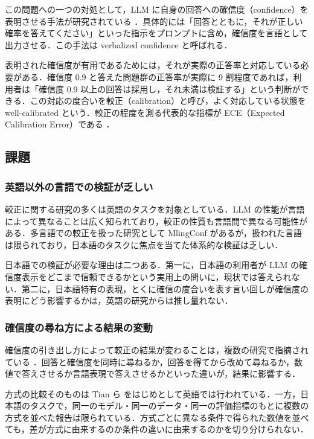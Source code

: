 この問題への一つの対処として，LLM に自身の回答への確信度（confidence）を表明させる手法が研究されている \cite{kadavath2022know,lin2022teaching,tian2023justask}．具体的には「回答とともに，それが正しい確率を答えてください」といった指示をプロンプトに含め，確信度を言語として出力させる．この手法は verbalized confidence と呼ばれる．

表明された確信度が有用であるためには，それが実際の正答率と対応している必要がある．確信度 0.9 と答えた問題群の正答率が実際に 9 割程度であれば，利用者は「確信度 0.9 以上の回答は採用し，それ未満は検証する」という判断ができる．この対応の度合いを較正（calibration）と呼び，よく対応している状態をwell-calibrated という．較正の程度を測る代表的な指標が ECE（Expected Calibration Error）である \cite{guo2017calibration}．

\subsection{課題}

\subsubsection{英語以外の言語での検証が乏しい}

較正に関する研究の多くは英語のタスクを対象としている．LLM の性能が言語によって異なることは広く知られており，較正の性質も言語間で異なる可能性がある．多言語での較正を扱った研究として MlingConf \cite{xue2025mlingconf} があるが，扱われた言語は限られており，日本語のタスクに焦点を当てた体系的な検証は乏しい．

日本語での検証が必要な理由は二つある．第一に，日本語の利用者が LLM の確信度表示をどこまで信頼できるかという実用上の問いに，現状では答えられない．第二に，日本語特有の表現，とくに確信の度合いを表す言い回しが確信度の表明にどう影響するかは，英語の研究からは推し量れない．

\subsubsection{確信度の尋ね方による結果の変動}

確信度の引き出し方によって較正の結果が変わることは，複数の研究で指摘されている \cite{tian2023justask,xiong2024llmuncertainty}．回答と確信度を同時に尋ねるか，回答を得てから改めて尋ねるか，数値で答えさせるか言語表現で答えさせるかといった違いが，結果に影響する．

方式の比較そのものは Tian ら \cite{tian2023justask} をはじめとして英語では行われている．一方，日本語のタスクで，同一のモデル・同一のデータ・同一の評価指標のもとに複数の方式を並べた報告は限られている．方式ごとに異なる条件で得られた数値を並べても，差が方式に由来するのか条件の違いに由来するのかを切り分けられない．

